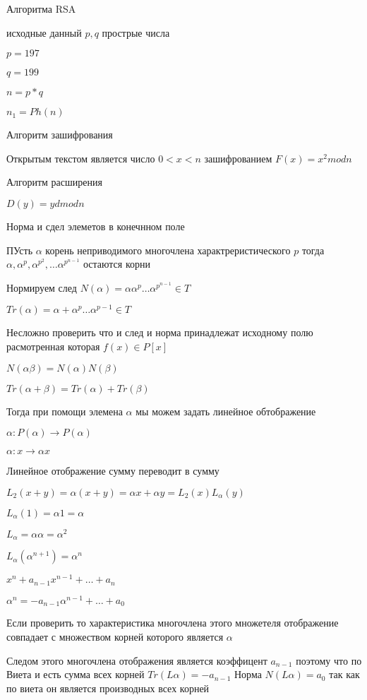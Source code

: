 Алгоритма RSA

исходные данный $p,q$ прострые числа

$p = 197$

$q = 199$

$n = p * q$

$n_1 = Ph(n)$

Алгоритм зашифрования

Открытым текстом является число $0<x<n$ зашифрованием $F(x) = x^2 mod n$

Алгоритм расширения

$D(y) = y d mod n$

Норма и сдел элеметов в конечнном поле

ПУсть $\alpha$ корень неприводимого многочлена характреристического $p$ тогда
$\alpha, \alpha^p, \alpha^{p^2}, \ldots \alpha^{p^{n-1}}$ остаются корни

Нормируем след $N(\alpha) = \alpha \alpha^p \ldots \alpha^{p^{n-1}} \in T$

$Tr(\alpha) = \alpha + \alpha^p \ldots \alpha^{p-1} \in T$

Несложно проверить что и след и норма принадлежат исходному полю расмотренная
которая $f(x) \in P[x]$

$N(\alpha \beta) = N(\alpha)N(\beta)$

$Tr(\alpha + \beta) = Tr(\alpha) + Tr(\beta)$

Тогда при помощи элемена $\alpha$ мы можем задать линейное обтображение

$\alpha: P(\alpha) \to P(\alpha)$

$\alpha: x \to \alpha x$

Линейное отображение сумму переводит в сумму

$L_2(x+y) = \alpha(x+y) = \alpha x + \alpha y = L_2(x) L_{\alpha}(y)$

$L_{\alpha}(1) = \alpha 1 = \alpha$

$L_{\alpha} = \alpha \alpha = \alpha^2$

$L_{\alpha} (\alpha^{n+1}) = \alpha^n$

$x^n + a_{n-1}x^{n-1} + \ldots + a_n$

$\alpha^n = - a_{n-1} \alpha^{n-1} + \ldots + a_0$

Если проверить то характеристика многочлена этого множетеля отображение
совпадает с множеством корней которого является $\alpha$

Следом этого многочлена отображения является коэффицент $a_{n-1}$ поэтому что
по Виета и есть сумма всех корней $Tr(L \alpha)= - a_{n-1}$ Норма
$N(L \alpha) = a_0$ так как по виета он является производных всех корней

